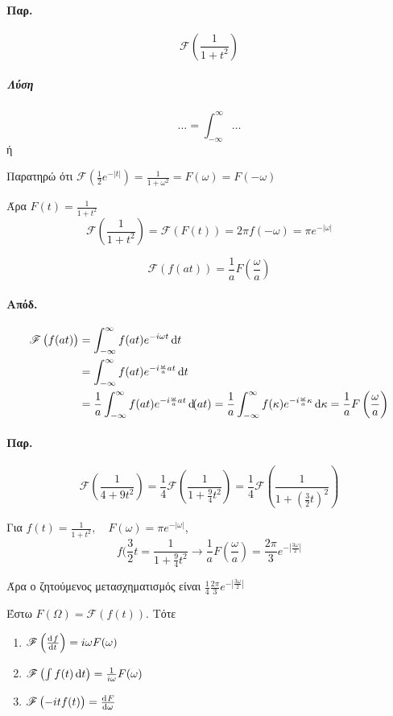 \documentclass[11pt,a4paper,titlepage,draft]{article}
\begin{document}
\paragraph{Παρ.}
\[
 \mathscr{F} \left(
 \frac{1}{1+t^2}
 \right)
\]
\subparagraph{Λύση}
\[
\dots = \int_{-\infty}^\infty \dots
\]
ή

Παρατηρώ ότι \( \mathscr{F} (\frac{1}{2}e^{-|t|}) = \frac{1}{1+\omega^2} = F(\omega) = F(-\omega)\)

Άρα \(F(t) = \frac{1}{1+t^2}\)
\[
 \mathscr{F}  \left(
 \frac{1}{1+t^2}
 \right) =  \mathscr{F} \left( F(t) \right) = 2\pi f(-\omega) = \pi e^{-|\omega|}
\]

\begin{theorem}{}{}
\[
 \mathscr{F} \left( f(at) \right) = \frac{1}{a} F \left(\frac{\omega}{a} \right)
\]
\end{theorem}
\paragraph{Απόδ.}
\begin{align*}
 \mathscr{F} \left( f(at) \right)&=\int_{-\infty}^\infty f(at) e^{-i  \omega t} \dif t
 \\ &=
 \int_{-\infty}^\infty f(at)e^{-i\frac{\omega}{a}at} \dif t
 \\ &=
\frac{1}{a}  \int_{-\infty}^\infty f(at)e^{-i\frac{\omega}{a}at} \dif (at)
=
\frac{1}{a} \int_{-\infty}^\infty f(\kappa) e^{-i\frac{\omega}{a}\kappa} \dif \kappa
= \frac{1}{a}	F\left( \frac{\omega}{a}\right)
\end{align*}

\paragraph{Παρ.}
\[
 \mathscr{F} \left( \frac{1}{4+9t^2} \right)
 = \frac{1}{4} \mathscr{F} \left( \frac{1}{1+\frac{9}{4}t^2} \right) 
 = \frac{1}{4}  \mathscr{F} \left( \frac{1}{1+\left(\frac{3}{2}t\right)^2} \right)
\]

Για \(f(t) = \frac{1}{1+t^2}, \quad F(\omega) = \pi e^{-|\omega|}\),
\[
f(\frac{3}{2}t = \frac{1}{1+\frac{9}{4}t^2} \rightarrow
\frac{1}{a} F\left(\frac{\omega}{a}\right) = \frac{2\pi}{3} e^{-\left|\frac{3\omega}{2}\right|}
\]

Άρα ο ζητούμενος μετασχηματισμός είναι \(
\frac{1}{4} \frac{2\pi}{3} e^{-\left|\frac{3\omega}{2}\right|}
\)


\begin{theorem*}{}
Έστω \(F(\Omega) = \mathscr{F}(f(t))\). Τότε
\begin{enumerate}
\item \(\mathscr{F}\left(\od{f}{t}\right) = i\omega F(\omega)\)
\item \(\mathscr{F}\left(\int f(t)\dif t\right) = \frac{1}{i\omega}F( \omega )\)
\item \(\mathscr{F}\left(-itf(t)\right) = \od{F}{\omega}\)
\end{enumerate}
\end{theorem*}
\end{document}
